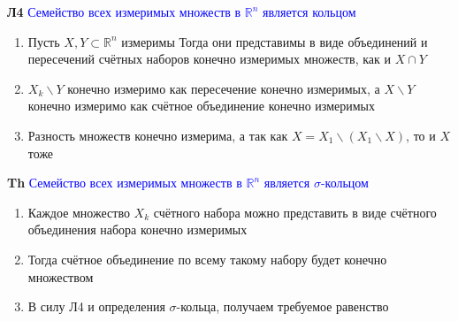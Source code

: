 \textbf{Л4} \textcolor{blue}{Семейство всех измеримых множеств в $\mathbb{R}^n$ является кольцом}

\begin{enumerate}
    \item Пусть $X,Y \subset \mathbb{R}^n$ измеримы
    Тогда они представимы в виде объединений и пересечений счётных наборов конечно измеримых множеств, как и $X \cap Y$
    \item $X_k \backslash Y$ конечно измеримо как пересечение конечно измеримых, а $X \backslash Y$ конечно измеримо как счётное объединение конечно измеримых
    \item Разность множеств конечно измерима, а так как $X = X_1 \backslash (X_1 \backslash X)$, то и $X$ тоже
\end{enumerate}

\textbf{Th} \textcolor{blue}{Семейство всех измеримых множеств в $\mathbb{R}^n$ является $\sigma$-кольцом}

\begin{enumerate}
    \item Каждое множество $X_k$ счётного набора можно представить в виде счётного объединения набора конечно измеримых
    \item Тогда счётное объединение по всему такому набору будет конечно  множеством
    \item В силу Л4 и определения $\sigma$-кольца, получаем требуемое равенство
\end{enumerate}